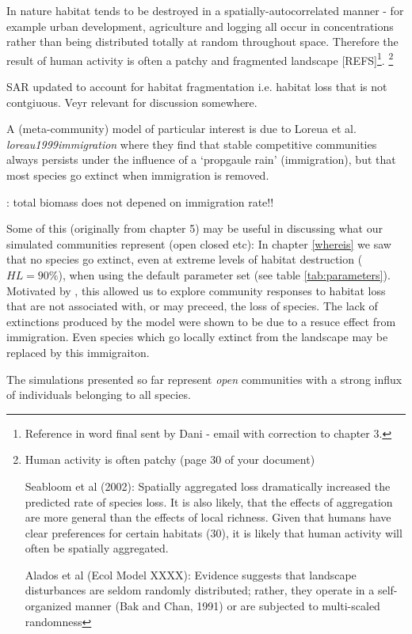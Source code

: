 In nature habitat tends to be destroyed in a spatially-autocorrelated manner - for example urban development, agriculture and logging all occur in concentrations rather than being distributed totally at random throughout space. Therefore the result of human activity is often a patchy and fragmented landscape [REFS]\footnote{Reference in word final sent by Dani - email with correction to chapter 3.}. 
\footnote{Human activity is often patchy (page 30 of your document)

Seabloom et al (2002): Spatially aggregated loss dramatically increased the predicted rate of species loss. It is also likely, that the effects of aggregation are more general than the effects of local richness. Given that humans have clear preferences for certain habitats (30), it is likely that human activity will often be spatially aggregated. 

Alados et al (Ecol Model XXXX): Evidence suggests that landscape disturbances are seldom randomly distributed; rather, they operate in a self-organized manner (Bak and Chan, 1991) or are subjected to multi-scaled randomness}

\cite{hanski2013species} SAR updated to account for habitat fragmentation i.e. habitat loss that is not contgiuous. Veyr relevant for discussion somewhere.


A (meta-community) model of particular interest is due to Loreua et al. \emph{loreau1999immigration} where they find that stable competitive communities always persists under the influence of a `propgaule rain' (immigration), but that most species go extinct when immigration is removed.

\cite{mouquet2004immigration} : total biomass does not depened on immigration rate!!

Some of this (originally from chapter 5) may be useful in discussing what our simulated communities represent (open closed etc):
In chapter \ref{whereis} we saw that no species go extinct, even at extreme levels of habitat destruction ($HL=90\%$), when using the default parameter set (see table \ref{tab:parameters}). Motivated by \cite{tylianakis2007habitat}, this allowed us to explore community responses to habitat loss that are not associated with, or may preceed, the loss of species. The lack of extinctions produced by the model were shown to be due to a resuce effect from immigration. Even species which go locally extinct from the landscape may be replaced by this immigraiton.    

The simulations presented so far represent \emph{open} communities with a strong influx of individuals belonging to all species.

